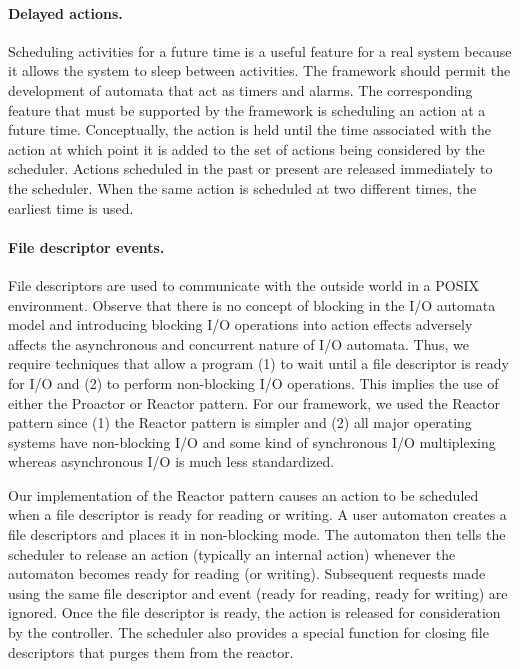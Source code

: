 \paragraph{Delayed actions.}
Scheduling activities for a future time is a useful feature for a real system because it allows the system to sleep between activities.
The framework should permit the development of automata that act as timers and alarms.
The corresponding feature that must be supported by the framework is scheduling an action at a future time.
Conceptually, the action is held until the time associated with the action at which point it is added to the set of actions being considered by the scheduler.
Actions scheduled in the past or present are released immediately to the scheduler.
When the same action is scheduled at two different times, the earliest time is used.

\paragraph{File descriptor events.}
File descriptors are used to communicate with the outside world in a POSIX environment.
Observe that there is no concept of blocking in the I/O automata model and introducing blocking I/O operations into action effects adversely affects the asynchronous and concurrent nature of I/O automata.
Thus, we require techniques that allow a program (1) to wait until a file descriptor is ready for I/O and (2) to perform non-blocking I/O operations.
This implies the use of either the Proactor or Reactor pattern.
For our framework, we used the Reactor pattern since (1) the Reactor pattern is simpler and (2) all major operating systems have non-blocking I/O and some kind of synchronous I/O multiplexing whereas asynchronous I/O is much less standardized.

Our implementation of the Reactor pattern causes an action to be scheduled when a file descriptor is ready for reading or writing.
A user automaton creates a file descriptors and places it in non-blocking mode.
The automaton then tells the scheduler to release an action (typically an internal action) whenever the automaton becomes ready for reading (or writing).
Subsequent requests made using the same file descriptor and event (ready for reading, ready for writing) are ignored.
Once the file descriptor is ready, the action is released for consideration by the controller.
The scheduler also provides a special function for closing file descriptors that purges them from the reactor.

